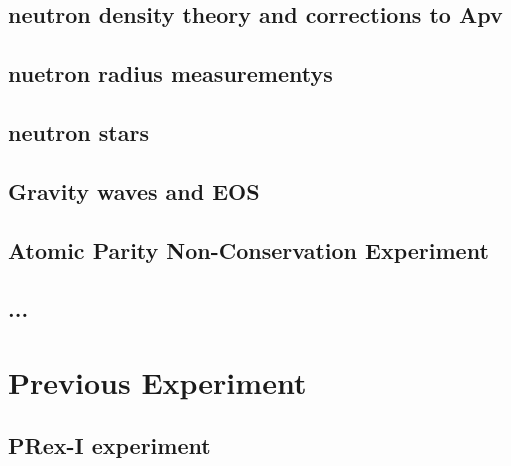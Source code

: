 \subsection{neutron density theory and corrections to Apv}
\subsection{nuetron radius measurementys}
\subsection{neutron stars}
\subsection{Gravity waves and EOS}
\subsection{Atomic Parity Non-Conservation Experiment}
\subsection{...}
\section{Previous Experiment}
\subsection{PRex-I experiment}